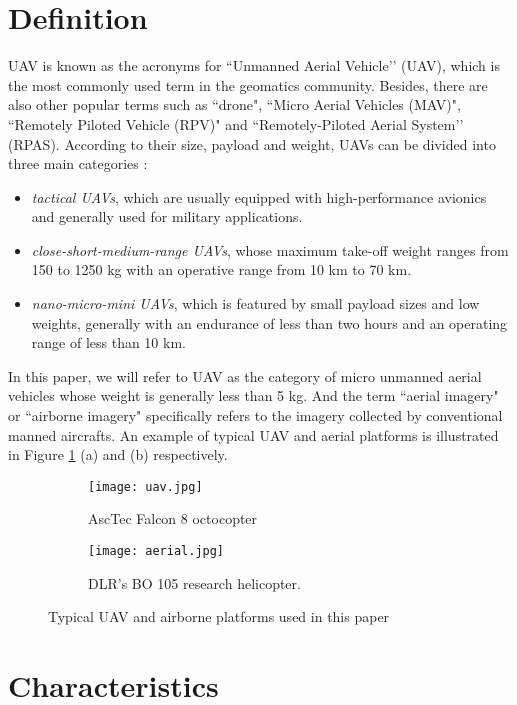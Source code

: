 \section{Definition}
UAV is known as the acronyms for ``Unmanned Aerial Vehicle’’ (UAV), which is the most commonly used term in the geomatics community. Besides, there are also other popular terms such as ``drone", ``Micro Aerial Vehicles (MAV)", ``Remotely Piloted Vehicle (RPV)" and ``Remotely-Piloted Aerial System’’ (RPAS). According to their size, payload and weight, UAVs can be divided into three main categories \cite{blyenburgh2013yearbook}: 
\begin{itemize}
\item \textit{tactical UAVs}, which are usually equipped with high-performance avionics and generally used for military applications.
\item \textit{close-short-medium-range UAVs}, whose maximum take-off weight ranges from 150 to 1250 kg with an operative range from 10 km to 70 km.  
\item \textit{nano-micro-mini UAVs}, which is featured by small payload sizes and low weights, generally with an endurance of less than two hours and an operating range of less than 10 km.
\end{itemize}


In this paper, we will refer to UAV as the category of micro unmanned aerial vehicles whose weight is generally less than 5 kg. And the term ``aerial imagery" or ``airborne imagery" specifically refers to the imagery collected by conventional manned aircrafts. An example of typical UAV and aerial platforms is illustrated in Figure \ref{fig:platforms} (a) and (b) respectively.

\begin{figure}[ht!]
    \centering
    \begin{subfigure}{.49\textwidth }
	\centering
        \texttt{[image: uav.jpg]}
        \caption{AscTec Falcon 8 octocopter}
    \end{subfigure}%
    \begin{subfigure}{.49\textwidth}
	\centering
        \texttt{[image: aerial.jpg]}
        \caption{DLR’s BO 105 research helicopter.}
    \end{subfigure}
\caption{Typical UAV and airborne platforms used in this paper}
\label{fig:platforms}
\end{figure}

\section{Characteristics}

